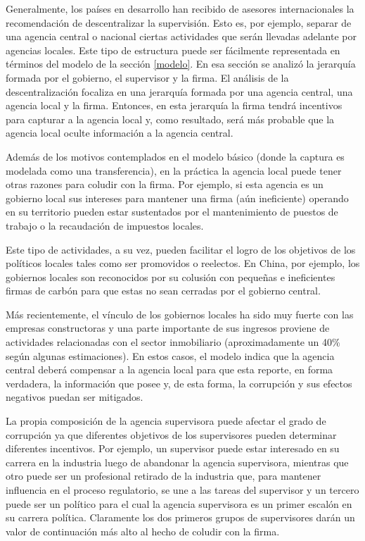 \documentclass[
  12pt,
  spanish,
]{book}
\begin{document}
Generalmente, los países en desarrollo han recibido de asesores internacionales la recomendación de descentralizar la supervisión. Esto es, por ejemplo, separar de una agencia central o nacional ciertas actividades que serán llevadas adelante por agencias locales. Este tipo de estructura puede ser fácilmente representada en términos del modelo de la sección \ref{modelo}. En esa sección se analizó la jerarquía formada por el gobierno, el supervisor y la firma. El análisis de la descentralización focaliza en una jerarquía formada por una agencia central, una agencia local y la firma. Entonces, en esta jerarquía la firma tendrá incentivos para capturar a la agencia local y, como resultado, será más probable que la agencia local oculte información a la agencia central.

Además de los motivos contemplados en el modelo básico (donde la captura es modelada como una transferencia), en la práctica la agencia local puede tener otras razones para coludir con la firma. Por ejemplo, si esta agencia es un gobierno local sus intereses para mantener una firma (aún ineficiente) operando en su territorio pueden estar sustentados por el mantenimiento de puestos de trabajo o la recaudación de impuestos locales.

Este tipo de actividades, a su vez, pueden facilitar el logro de los objetivos de los políticos locales tales como ser promovidos o reelectos. En China, por ejemplo, los gobiernos locales son reconocidos por su colusión con pequeñas e ineficientes firmas de carbón para que estas no sean cerradas por el gobierno central.

Más recientemente, el vínculo de los gobiernos locales ha sido muy fuerte con las empresas constructoras y una parte importante de sus ingresos proviene de actividades relacionadas con el sector inmobiliario (aproximadamente un 40\% según algunas estimaciones). En estos casos, el modelo indica que la agencia central deberá compensar a la agencia local para que esta reporte, en forma verdadera, la información que posee y, de esta forma, la corrupción y sus efectos negativos puedan ser mitigados.

La propia composición de la agencia supervisora puede afectar el grado de corrupción ya que diferentes objetivos de los supervisores pueden determinar diferentes incentivos. Por ejemplo, un supervisor puede estar interesado en su carrera en la industria luego de abandonar la agencia supervisora, mientras que otro puede ser un profesional retirado de la industria que, para mantener influencia en el proceso regulatorio, se une a las tareas del supervisor y un tercero puede ser un político para el cual la agencia supervisora es un primer escalón en su carrera política. Claramente los dos primeros grupos de supervisores darán un valor de continuación más alto al hecho de coludir con la firma.
\end{document}
